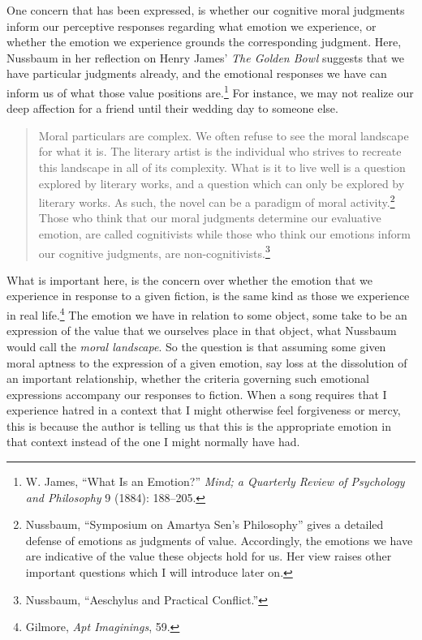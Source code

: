 \documentclass[
  12pt,
]{book}
\theoremstyle{definition}
\theoremstyle{definition}
\theoremstyle{definition}
\theoremstyle{definition}
\theoremstyle{remark}
\begin{document}
One concern that has been expressed, is whether our cognitive moral judgments inform our perceptive responses regarding what emotion we experience, or whether the emotion we experience grounds the corresponding judgment. Here, Nussbaum in her reflection on Henry James' \emph{The Golden Bowl} suggests that we have particular judgments already, and the emotional responses we have can inform us of what those value positions are.\footnote{W. James, {``What Is an Emotion?''} \emph{Mind; a Quarterly Review of Psychology and Philosophy} 9 (1884): 188--205.} For instance, we may not realize our deep affection for a friend until their wedding day to someone else.

\begin{quote}
Moral particulars are complex. We often refuse to see the moral landscape for what it is. The literary artist is the individual who strives to recreate this landscape in all of its complexity. What is it to live well is a question explored by literary works, and a question which can only be explored by literary works. As such, the novel can be a paradigm of moral activity.\footnote{Nussbaum, {``Symposium on {Amartya Sen}'s Philosophy''} gives a detailed defense of emotions as judgments of value. Accordingly, the emotions we have are indicative of the value these objects hold for us. Her view raises other important questions which I will introduce later on.} Those who think that our moral judgments determine our evaluative emotion, are called cognitivists while those who think our emotions inform our cognitive judgments, are non-cognitivists.\footnote{Nussbaum, {``Aeschylus and Practical Conflict.''}}
\end{quote}

What is important here, is the concern over whether the emotion that we experience in response to a given fiction, is the same kind as those we experience in real life.\footnote{Gilmore, \emph{Apt {Imaginings}}, 59.} The emotion we have in relation to some object, some take to be an expression of the value that we ourselves place in that object, what Nussbaum would call the \emph{moral landscape}. So the question is that assuming some given moral aptness to the expression of a given emotion, say loss at the dissolution of an important relationship, whether the criteria governing such emotional expressions accompany our responses to fiction. When a song requires that I experience hatred in a context that I might otherwise feel forgiveness or mercy, this is because the author is telling us that this is the appropriate emotion in that context instead of the one I might normally have had.
\end{document}
